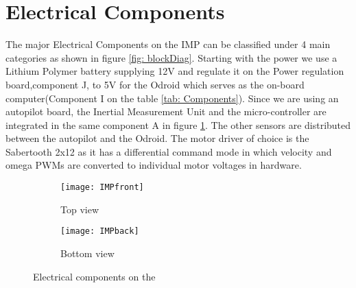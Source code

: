 \section{Electrical Components}
The major Electrical Components on the IMP can be classified under 4 main categories as shown in figure \ref{fig: blockDiag}. Starting with the power we use a Lithium Polymer battery supplying 12V and regulate it on the Power regulation board,component J, to 5V for the Odroid which serves as the on-board computer(Component I on the table \ref{tab: Components}). Since we are using an autopilot board, the Inertial Measurement Unit and the micro-controller are integrated in the same component A in figure \ref{fig:IMPfront}. The other sensors are distributed between the autopilot and the Odroid. The motor driver of choice is the Sabertooth 2x12 as it has a differential command mode in which velocity and omega PWMs are converted to individual motor voltages in hardware. 

\begin{figure}[h!]
    \centering
    \begin{subfigure}[b]{0.4\textwidth}
	    \texttt{[image: IMPfront]}
	    \caption{Top view}
	    \label{fig:IMPfront}
    \end{subfigure}
    \quad %
    \begin{subfigure}[b]{0.3\textwidth}
		\texttt{[image: IMPback]}
		\caption{Bottom view}
		\label{fig:IMPback}
    \end{subfigure}%
    \caption{Electrical components on the \imp}
    \label{fig:IMPparts}
\end{figure}


